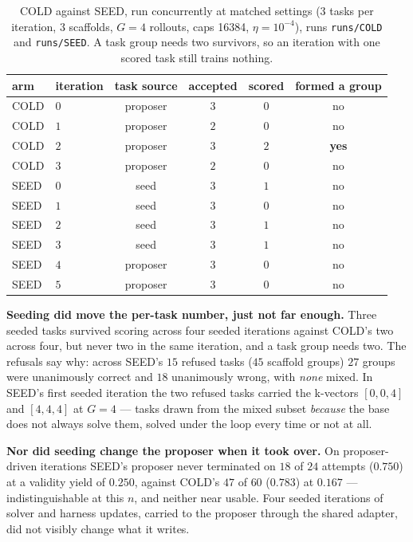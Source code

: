 \begin{table}[t]
\centering\small
\caption{COLD against SEED, run concurrently at matched settings (3 tasks per iteration,
3 scaffolds, $G=4$ rollouts, caps 16384, $\eta=10^{-4}$), runs \texttt{runs/COLD} and
\texttt{runs/SEED}. A task group needs two survivors, so an iteration with one scored task
still trains nothing.}
\label{tab:seedarms}
\begin{tabular}{llcccc}
\toprule
arm & iteration & task source & accepted & scored & formed a group \\
\midrule
COLD & $0$ & proposer & $3$ & $0$ & no \\
COLD & $1$ & proposer & $2$ & $0$ & no \\
COLD & $2$ & proposer & $3$ & $2$ & \textbf{yes} \\
COLD & $3$ & proposer & $2$ & $0$ & no \\
\addlinespace
SEED & $0$ & seed     & $3$ & $1$ & no \\
SEED & $1$ & seed     & $3$ & $0$ & no \\
SEED & $2$ & seed     & $3$ & $1$ & no \\
SEED & $3$ & seed     & $3$ & $1$ & no \\
SEED & $4$ & proposer & $3$ & $0$ & no \\
SEED & $5$ & proposer & $3$ & $0$ & no \\
\bottomrule
\end{tabular}
\end{table}

\textbf{Seeding did move the per-task number, just not far enough.} Three seeded tasks survived
scoring across four seeded iterations against COLD's two across four, but never two in the same
iteration, and a task group needs two. The refusals say why: across SEED's $15$ refused tasks
($45$ scaffold groups) $27$ groups were unanimously correct and $18$ unanimously wrong, with
\emph{none} mixed. In SEED's first seeded iteration the two refused tasks carried the k-vectors
$[0,0,4]$ and $[4,4,4]$ at $G=4$ --- tasks drawn from the mixed subset \emph{because} the base
does not always solve them, solved under the loop every time or not at all.

\textbf{Nor did seeding change the proposer when it took over.} On proposer-driven iterations
SEED's proposer never terminated on $18$ of $24$ attempts ($0.750$) at a validity yield of
$0.250$, against COLD's $47$ of $60$ ($0.783$) at $0.167$ --- indistinguishable at this $n$, and
neither near usable. Four seeded iterations of solver and harness updates, carried to the
proposer through the shared adapter, did not visibly change what it writes.

